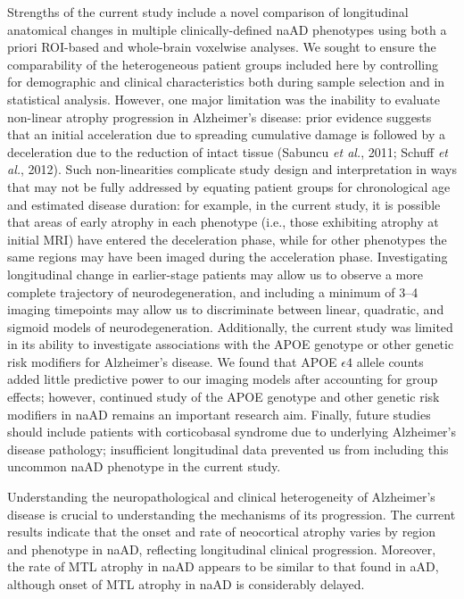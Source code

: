 \documentclass[]{article}
\begin{document}
Strengths of the current study include a novel comparison of
longitudinal anatomical changes in multiple clinically-defined naAD
phenotypes using both a priori ROI-based and whole-brain voxelwise
analyses. We sought to ensure the comparability of the heterogeneous
patient groups included here by controlling for demographic and clinical
characteristics both during sample selection and in statistical
analysis. However, one major limitation was the inability to evaluate
non-linear atrophy progression in Alzheimer's disease: prior evidence
suggests that an initial acceleration due to spreading cumulative damage
is followed by a deceleration due to the reduction of intact tissue
(Sabuncu \emph{et al.}, 2011; Schuff \emph{et al.}, 2012). Such
non-linearities complicate study design and interpretation in ways that
may not be fully addressed by equating patient groups for chronological
age and estimated disease duration: for example, in the current study,
it is possible that areas of early atrophy in each phenotype (i.e.,
those exhibiting atrophy at initial MRI) have entered the deceleration
phase, while for other phenotypes the same regions may have been imaged
during the acceleration phase. Investigating longitudinal change in
earlier-stage patients may allow us to observe a more complete
trajectory of neurodegeneration, and including a minimum of 3--4 imaging
timepoints may allow us to discriminate between linear, quadratic, and
sigmoid models of neurodegeneration. Additionally, the current study was
limited in its ability to investigate associations with the APOE
genotype or other genetic risk modifiers for Alzheimer's disease. We
found that APOE \(\epsilon4\) allele counts added little predictive
power to our imaging models after accounting for group effects; however,
continued study of the APOE genotype and other genetic risk modifiers in
naAD remains an important research aim. Finally, future studies should
include patients with corticobasal syndrome due to underlying
Alzheimer's disease pathology; insufficient longitudinal data prevented
us from including this uncommon naAD phenotype in the current study.

Understanding the neuropathological and clinical heterogeneity of
Alzheimer's disease is crucial to understanding the mechanisms of its
progression. The current results indicate that the onset and rate of
neocortical atrophy varies by region and phenotype in naAD, reflecting
longitudinal clinical progression. Moreover, the rate of MTL atrophy in
naAD appears to be similar to that found in aAD, although onset of MTL
atrophy in naAD is considerably delayed.
\end{document}
